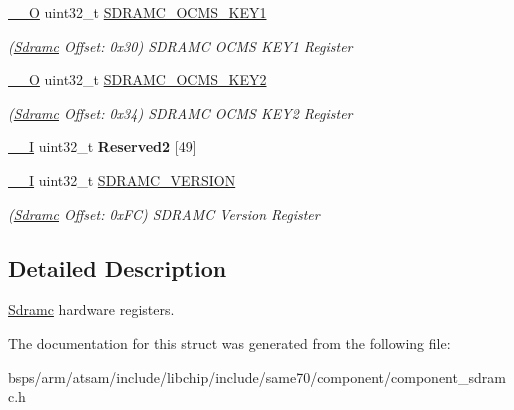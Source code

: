 \begin{DoxyCompactItemize}
\mbox{\hyperlink{core__cm7_8h_a7e25d9380f9ef903923964322e71f2f6}{\+\_\+\+\_\+O}} uint32\+\_\+t \mbox{\hyperlink{structSdramc_a70166aa64c94c302923d050f0dc5bbbe}{S\+D\+R\+A\+M\+C\+\_\+\+O\+C\+M\+S\+\_\+\+K\+E\+Y1}}
\begin{DoxyCompactList}\small\item\em (\mbox{\hyperlink{structSdramc}{Sdramc}} Offset\+: 0x30) S\+D\+R\+A\+MC O\+C\+MS K\+E\+Y1 Register \end{DoxyCompactList}\item 
\mbox{\label{structSdramc_a1a1541444f30d218c1169598def98c53}} 
\mbox{\hyperlink{core__cm7_8h_a7e25d9380f9ef903923964322e71f2f6}{\+\_\+\+\_\+O}} uint32\+\_\+t \mbox{\hyperlink{structSdramc_a1a1541444f30d218c1169598def98c53}{S\+D\+R\+A\+M\+C\+\_\+\+O\+C\+M\+S\+\_\+\+K\+E\+Y2}}
\begin{DoxyCompactList}\small\item\em (\mbox{\hyperlink{structSdramc}{Sdramc}} Offset\+: 0x34) S\+D\+R\+A\+MC O\+C\+MS K\+E\+Y2 Register \end{DoxyCompactList}\item 
\mbox{\label{structSdramc_a9f93ec6b6a03296e3053586928bd16d3}} 
\mbox{\hyperlink{core__cm7_8h_af63697ed9952cc71e1225efe205f6cd3}{\+\_\+\+\_\+I}} uint32\+\_\+t {\bfseries Reserved2} \mbox{[}49\mbox{]}
\item 
\mbox{\label{structSdramc_ab2f52ee45f71efa38e61ac2965466350}} 
\mbox{\hyperlink{core__cm7_8h_af63697ed9952cc71e1225efe205f6cd3}{\+\_\+\+\_\+I}} uint32\+\_\+t \mbox{\hyperlink{structSdramc_ab2f52ee45f71efa38e61ac2965466350}{S\+D\+R\+A\+M\+C\+\_\+\+V\+E\+R\+S\+I\+ON}}
\begin{DoxyCompactList}\small\item\em (\mbox{\hyperlink{structSdramc}{Sdramc}} Offset\+: 0x\+FC) S\+D\+R\+A\+MC Version Register \end{DoxyCompactList}\end{DoxyCompactItemize}


\subsection{Detailed Description}
\mbox{\hyperlink{structSdramc}{Sdramc}} hardware registers. 

The documentation for this struct was generated from the following file\+:\begin{DoxyCompactItemize}
\item 
bsps/arm/atsam/include/libchip/include/same70/component/component\+\_\+sdramc.\+h\end{DoxyCompactItemize}
